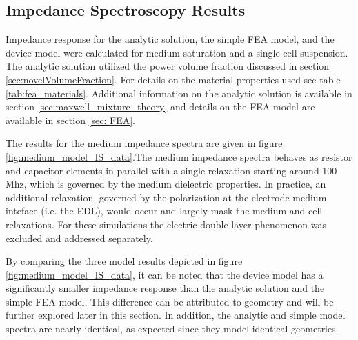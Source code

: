 \subsection{Impedance Spectroscopy Results}

\par Impedance response for the analytic solution, the simple FEA model, and the device model were calculated for medium saturation and a single cell suspension. The analytic solution utilized the power volume fraction discussed in section \ref{sec:novelVolumeFraction}. For details on the material properties used see table \ref{tab:fea_materials}. Additional information on the analytic solution is available in section \ref{sec:maxwell_mixture_theory} and details on the FEA model are available in section \ref{sec: FEA}. 

\par The results for the medium impedance spectra are given in figure \ref{fig:medium_model_IS_data}.The medium impedance spectra behaves as resistor and capacitor elements in parallel with a single relaxation starting around 100 Mhz, which is governed by the medium dielectric properties. In practice, an additional relaxation, governed by the polarization at the electrode-medium inteface (i.e. the EDL), would occur and largely mask the medium and cell relaxations. For these simulations the electric double layer phenomenon was excluded and addressed separately.

\par By comparing the three model results depicted in figure \ref{fig:medium_model_IS_data}, it can be noted that the device model has a significantly smaller impedance response than the analytic solution and the simple FEA model. This difference can be attributed to geometry and will be further explored later in this section. In addition, the analytic and simple model spectra are nearly identical, as expected since they model identical geometries.

